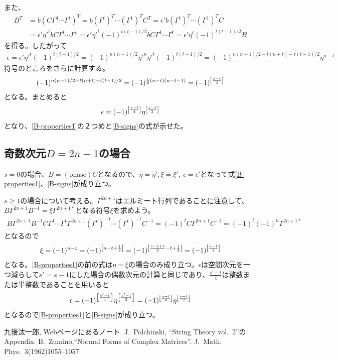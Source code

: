 \documentclass[12pt,a4paper]{jlreq}
\begin{document}
また、
\begin{align*}
  B^T&=b( C \Gamma^{1} \cdots \Gamma^{t})^T
  =b (\Gamma^{t})^T \cdots (\Gamma^{1})^T C^T
  =\epsilon' b (\Gamma^{t})^T \cdots (\Gamma^{1})^T C\\
  &=\epsilon' \eta'^{t} b C \Gamma^{t} \cdots \Gamma^{1}
  =\epsilon' \eta'^{t} (-1)^{t(t-1)/2}b C \Gamma^{1} \cdots \Gamma^{t}=\epsilon' \eta^{t} (-1)^{t(t-1)/2} B
\end{align*}
を得る。したがって
\begin{align*}
  \epsilon=\epsilon' \eta'^{t} (-1)^{t(t-1)/2}
  =(-1)^{n(n-1)/2} \eta'^n \eta'^{t} (-1)^{t(t-1)/2}
  =(-1)^{n(n-1)/2-t(n+t)-t(t-1)/2} \eta^{n-t}
\end{align*}
符号のところをさらに計算する。
\begin{align*}
  (-1)^{n(n-1)/2-t(n+t)+t(t-1)/2}=(-1)^{\frac12 (n-t)(n-t-1)}
  =(-1)^{\qty[\frac{s-t}{4}]}
\end{align*}
となる。まとめると
\begin{align*}
  \epsilon=(-1)^{\qty[\frac{s-t}{4}]}\eta^{\qty[\frac{s-t}{2}]}
\end{align*}
となり、\eqref{B-properties1}の２つめと\eqref{B-signs}の式が示せた。

\subsection{奇数次元$D=2n+1$の場合}
$s=0$の場合、$B=(\text{phase}) C$となるので、$\eta=\eta', \xi=\xi',\ \epsilon=\epsilon'$となって式\eqref{B-properties1}、\eqref{B-signs}が成り立つ。

$s\ge 1$の場合について考える。$\Gamma^{2n+1}$はエルミート行列であることに注意して、$B \Gamma^{2n+1} B^{-1}=\xi \Gamma^{2n+1 *}$となる符号$\xi$を求めよう。
\begin{align*}
  B \Gamma^{2n+1} B^{-1}
  C \Gamma^{1} \cdots \Gamma^{t} \Gamma^{2n+1}
  (\Gamma^{t})^{-1} \cdots (\Gamma^{t})^{-1}C^{-1}
  =(-1)^{t} C \Gamma^{2n+1} C^{-1}
  =(-1)^{t}(-1)^{n} \Gamma^{2n+1 *}
\end{align*}
となるので
\begin{align*}
  \xi=(-1)^{n-t}
  =(-1)^{\qty[n-t+\frac12]}
  =(-1)^{\qty[\frac{s-1+t}{2}-t+\frac12]}
  =(-1)^{\qty[\frac{s-t}{2}]}
\end{align*}
となる。\eqref{B-properties1}の前の式は$\eta=\xi$の場合のみ成り立つ。$\epsilon$は空間次元を一つ減らして$s'=s-1$にした場合の偶数次元の計算と同じであり、$\frac{s'-t}{4}$は整数または半整数であることを用いると
\begin{align*}
  \epsilon
  =(-1)^{\qty[\frac{s'-t}{4}]}\eta^{\qty[\frac{s'-t}{2}]}  
  =(-1)^{\qty[\frac{s-t}{4}]}\eta^{\qty[\frac{s-t}{2}]}
\end{align*}
となるので\eqref{B-properties1}と\eqref{B-signs}が成り立つ。

\begin{thebibliography}{9}
   九後汰一郎, Webページにあるノート.
   J.~Polchinski, ``String Theory vol.~2''のAppendix.
   B.~Zumino,``Normal Forms of Complex Matrices''. J.~Math.~ Phys.\ 3(1962)1055–1057
\end{thebibliography}
\end{document}
